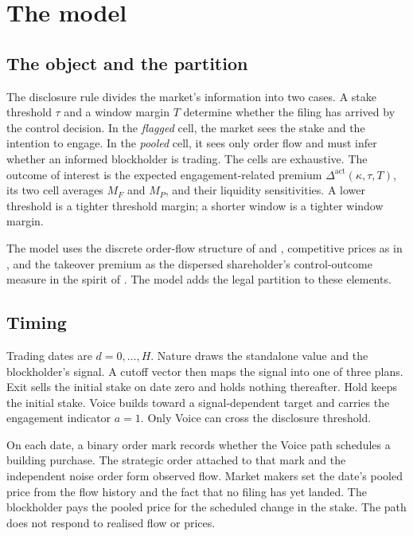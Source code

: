 \documentclass[11pt]{article}
\newcommand{\Dact}{\Delta^{\mathrm{act}}}
\begin{document}
\section{The model}
\label{sec:model}

\subsection{The object and the partition}
\label{sec:object}

The disclosure rule divides the market's information into two cases. A stake threshold $\tau$
and a window margin $T$ determine whether the filing has arrived by the control decision. In
the \emph{flagged} cell, the market sees the stake and the intention to engage. In the
\emph{pooled} cell, it sees only order flow and must infer whether an informed blockholder is
trading. The cells are exhaustive. The outcome of interest is the expected engagement-related
premium $\Dact(\kappa,\tau,T)$, its two cell averages $M_F$ and $M_P$, and their liquidity
sensitivities. A lower threshold is a tighter threshold margin; a shorter window is a tighter
window margin.

The model uses the discrete order-flow structure of \citet{Kyle1985} and
\citet{EdmansGoldsteinJiang2015}, competitive prices as in \citet{GlostenMilgrom1985}, and the
takeover premium as the dispersed shareholder's control-outcome measure in the spirit of
\citet{GrossmanHart1980}. The model adds the legal partition to these elements.

\subsection{Timing}
\label{sec:timing}

Trading dates are $d=0,\ldots,H$. Nature draws the standalone value and the blockholder's
signal. A cutoff vector then maps the signal into one of three plans. Exit sells the initial
stake on date zero and holds nothing thereafter. Hold keeps the initial stake. Voice builds
toward a signal-dependent target and carries the engagement indicator $a=1$. Only Voice can
cross the disclosure threshold.

On each date, a binary order mark records whether the Voice path schedules a building purchase. The
strategic order attached to that mark and the independent noise order form observed flow. Market
makers set the date's pooled price from the flow history and the fact that no filing has yet landed.
The blockholder pays the pooled price for the scheduled change in the stake. The path does not
respond to realised flow or prices.
\end{document}
